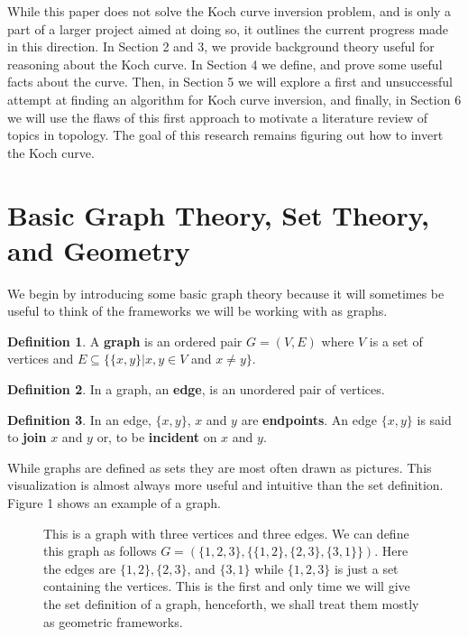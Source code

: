\documentclass{article}
\theoremstyle{definition}
\newtheorem{definition}{Definition}[section]
\begin{document}
While this paper does not solve the Koch curve inversion problem, and is only a part of a larger project aimed at doing so, it outlines the current progress made in this direction. In Section 2 and 3, we provide background theory useful for reasoning about the Koch curve. In Section 4 we define, and prove some useful facts about the curve. Then, in Section 5 we will explore a first and unsuccessful attempt at finding an algorithm for Koch curve inversion, and finally, in Section 6 we will use the flaws of this first approach to motivate a literature review of topics in topology. The goal of this research remains figuring out how to invert the Koch curve.
\section{Basic Graph Theory, Set Theory, and Geometry}
We begin by introducing some basic graph theory because it will sometimes be useful to think of the frameworks we will be working with as graphs.
\begin{definition}
    A \textbf{graph} is an ordered pair $G = (V, E)$ where $V$ is a set of vertices and $E \subseteq \{\{x, y\}|x, y \in V$ and $x \neq y\}$.
\end{definition}
\begin{definition}
    In a graph, an \textbf{edge}, is an unordered pair of vertices.
\end{definition}
\begin{definition}
    In an edge, $\{x, y\}$, $x$ and $y$ are \textbf{endpoints}. An edge $\{x, y\}$ is said to \textbf{join} $x$ and $y$ or, to be \textbf{incident} on $x$ and $y$.
\end{definition}
\noindent While graphs are defined as sets they are most often drawn as pictures. This visualization is almost always more useful and intuitive than the set definition. Figure 1 shows an example of a graph.\vspace{0.5em}\\
\begin{figure}[h]
    \centering
    \caption{This is a graph with three vertices and three edges. We can define this graph as follows $G = (\{1, 2, 3\}, \{\{1, 2\}, \{2, 3\}, \{3, 1\}\})$. Here the edges are $\{1, 2\}, \{2, 3\}$, and $\{3, 1\}$ while $\{1, 2, 3\}$ is just a set containing the vertices. This is the first and only time we will give the set definition of a graph, henceforth, we shall treat them mostly as geometric frameworks.}
\end{figure}
\end{document}

